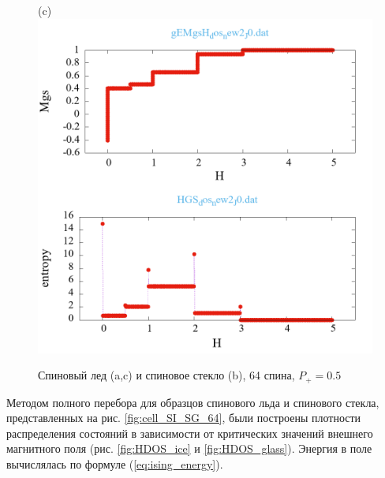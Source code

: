 \documentclass[utf8, babel, sor, jor, amsmath, amssymb, reprint]{elsarticle} %
\begin{document}
\begin{figure}[H]
\begin{minipage}[h]{0.32\linewidth}
	\end{minipage}
	\hfill
	\begin{minipage}[h]{0.32\linewidth}
		\centering(c)
		\includegraphics[width=1\linewidth]{pictures/_multiplot_SI64_J0}
	\end{minipage}
	
	\caption{Спиновый лед (a,c) и спиновое стекло (b), 64 спина, $P_+ = 0.5$}
	\label{fig:_multiplot_SI_SG_64}
	
\end{figure}




Методом полного перебора для образцов спинового льда и спинового стекла, представленных на рис. \ref{fig:cell_SI_SG_64}, были построены плотности распределения состояний в зависимости от критических значений внешнего магнитного поля (рис. \ref{fig:HDOS_ice} и \ref{fig:HDOS_glass}).
Энергия в поле вычислялась по формуле (\ref{eq:ising_energy}).
\end{document}
